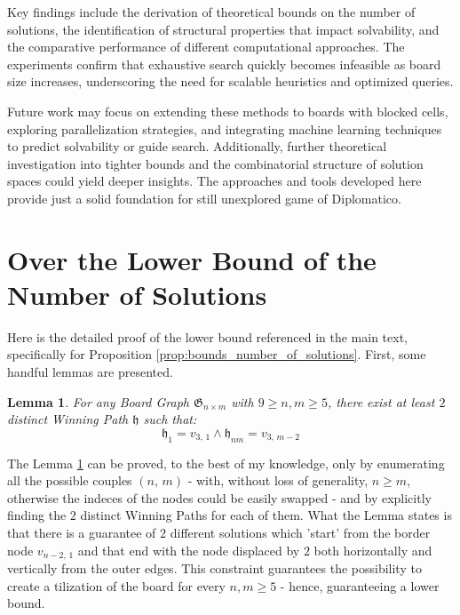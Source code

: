 \documentclass[conference]{IEEEtran}
\newtheorem{lemma}{Lemma}[section]
\begin{document}
Key findings include the derivation of theoretical bounds on the number of solutions, the identification of structural properties that impact solvability, and the comparative performance of different computational approaches. The experiments confirm that exhaustive search quickly becomes infeasible as board size increases, underscoring the need for scalable heuristics and optimized queries.

Future work may focus on extending these methods to boards with blocked cells, exploring parallelization strategies, and integrating machine learning techniques to predict solvability or guide search. Additionally, further theoretical investigation into tighter bounds and the combinatorial structure of solution spaces could yield deeper insights. The approaches and tools developed here provide just a solid foundation for still unexplored game of Diplomatico.




\newpage
\appendices
\section{Over the Lower Bound of the Number of Solutions} 	\label{appendix:proof_lower_bound}


Here is the detailed proof of the lower bound referenced in the main text, specifically for Proposition \ref{prop:bounds_number_of_solutions}.
First, some handful lemmas are presented.

\begin{lemma} \label{lem:two_boards_horizontal}
    For any Board Graph $\mathfrak{G}_{n \times m}$ with $9 \ge n, m \ge 5$, there exist at least $2$ distinct Winning Path $\mathfrak{h}$ such that:
    $$
        \mathfrak{h}_1 = v_{3,\,1} \land \mathfrak{h}_{nm} = v_{3,\,m-2} 
    $$
\end{lemma}

The Lemma \ref{lem:two_boards_horizontal} can be proved, to the best of my knowledge, only by enumerating all the possible couples $(n,\,m)$ - with, without loss of generality, $n \ge m$, otherwise the indeces of the nodes could be easily swapped -
and by explicitly finding the $2$ distinct Winning Paths for each of them.
What the Lemma states is that there is a guarantee of $2$ different solutions which 'start' from the border node $v_{n-2,\,1}$ and that end with the node displaced by $2$ both horizontally and vertically from the outer edges.
This constraint guarantees the possibility to create a tilization of the board for every $n, m \ge 5$ - hence, guaranteeing a lower bound.
\end{document}
